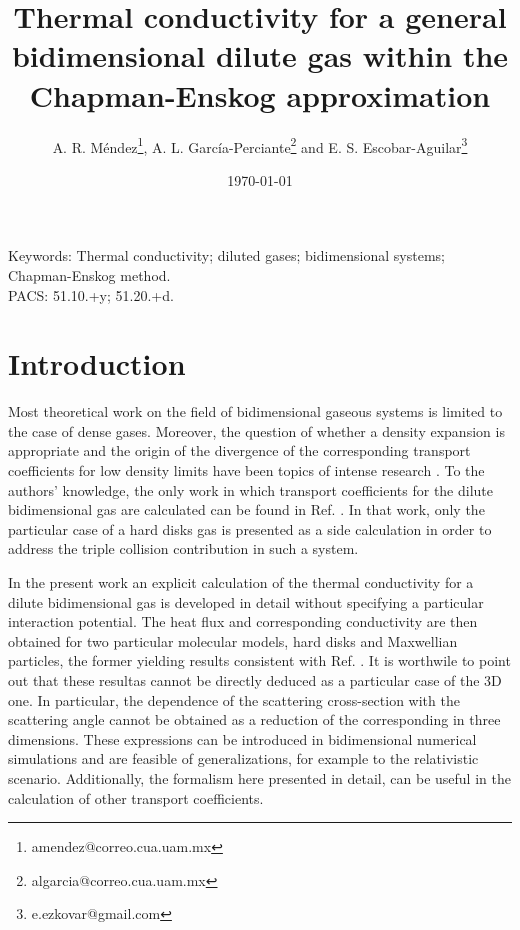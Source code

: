 \documentclass[11pt]{article} %
\title{Thermal conductivity for a general bidimensional dilute gas within
the Chapman-Enskog approximation}
\author{A. R. M\'endez\footnote{amendez@correo.cua.uam.mx}, A. L. Garc\'{i}a-Perciante\footnote{algarcia@correo.cua.uam.mx} and E. S. Escobar-Aguilar\footnote{e.ezkovar@gmail.com}}
\date{\today}
\begin{document}
\maketitle
{}
\section*{}
Keywords: Thermal conductivity; diluted gases; bidimensional systems; Chapman-Enskog method.\\
PACS: 51.10.+y; 51.20.+d.

\section{Introduction}

Most theoretical work on the field of bidimensional gaseous systems
is limited to the case of dense gases. Moreover, the question of whether
a density expansion is appropriate and the origin of the divergence
of the corresponding transport coefficients for low density limits
have been topics of intense research \cite{ Sengers,Sengers1,Gass,Risso1,Risso2,Cohen,Garcia-Rojo, Hanley,Ernst}.
To the authors' knowledge, the only work in which transport coefficients
for the dilute bidimensional gas are calculated can be found in Ref.
\cite{Sengers}. In that work, only the particular case of a hard
disks gas is presented as a side calculation in order to address the
triple collision contribution in such a system.  

In the present work an explicit calculation of the thermal conductivity
for a dilute bidimensional gas is developed in detail without specifying
a particular interaction potential. The heat flux and corresponding
conductivity are then obtained for two particular molecular models,
hard disks and Maxwellian particles, the former yielding results consistent
with Ref. \cite{Sengers}. It is worthwile to point out that these resultas cannot 
be directly deduced as a particular case of the 3D one. In particular, the dependence
of the scattering cross-section with the scattering angle cannot be obtained as a reduction of the 
corresponding in three dimensions. These expressions can be introduced in
bidimensional numerical simulations and are feasible of generalizations,
for example to the relativistic scenario. Additionally, the formalism
here presented in detail, can be useful in the calculation of other
transport coefficients.
\end{document}
